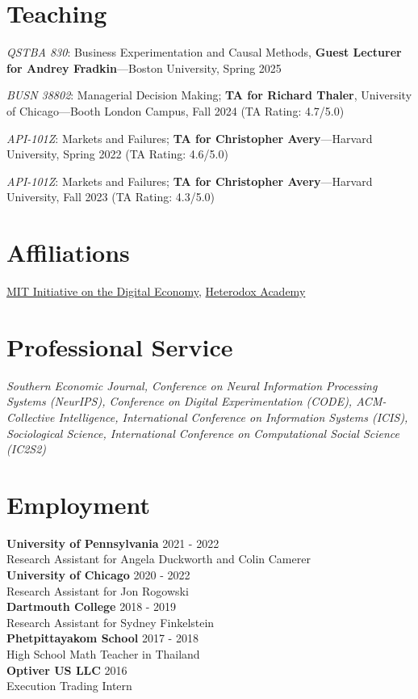 \documentclass[margin,line,pifont,palatino,courier, 9pt]{res}
\begin{document}
\begin{resume}
\section{\sc Teaching}
\textit{QSTBA 830}: Business Experimentation and Causal Methods, \textbf{Guest Lecturer for Andrey Fradkin}---Boston University, Spring 2025

\textit{BUSN 38802}: Managerial Decision Making; \textbf{TA for Richard Thaler}, University of Chicago---Booth London Campus, Fall 2024 (TA Rating: 4.7/5.0)

\textit{API-101Z}: Markets and Failures; \textbf{TA for Christopher Avery}---Harvard University, Spring 2022 (TA Rating: 4.6/5.0)

\textit{API-101Z}: Markets and Failures; \textbf{TA for Christopher Avery}---Harvard University, Fall 2023 (TA Rating: 4.3/5.0)

\section{\sc Affiliations}
\href{https://ide.mit.edu/}{MIT Initiative on the Digital Economy}, \href{https://heterodoxacademy.org/}{Heterodox Academy}

\section{\sc Professional Service}
\textit{Southern Economic Journal, Conference on Neural Information Processing Systems (NeurIPS), Conference on Digital Experimentation (CODE), ACM-Collective Intelligence, International Conference on Information Systems (ICIS), Sociological Science, International Conference on Computational Social Science (IC2S2)}

\section{\sc Employment}
\textbf{University of Pennsylvania} \hfill 2021 - 2022 \\
Research Assistant for Angela Duckworth and Colin Camerer \vspace{2mm}\\
\textbf{University of Chicago} \hfill 2020 - 2022\\
Research Assistant for Jon Rogowski \vspace{2mm}\\
\textbf{Dartmouth College} \hfill 2018 - 2019 \\
Research Assistant for Sydney Finkelstein \vspace{2mm}\\
\textbf{Phetpittayakom School} \hfill 2017 - 2018 \\
High School Math Teacher in Thailand \vspace{2mm}\\ 
\textbf{Optiver US LLC} \hfill 2016 \\
Execution Trading Intern

\end{resume}
\end{document}
